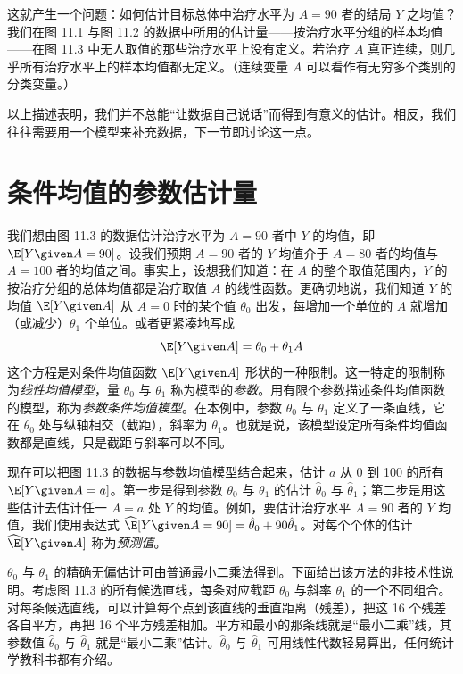 这就产生一个问题：如何估计目标总体中治疗水平为 $A=90$ 者的结局 $Y$ 之均值？我们在图 11.1 与图 11.2 的数据中所用的估计量——按治疗水平分组的样本均值——在图 11.3 中无人取值的那些治疗水平上没有定义。若治疗 $A$ 真正连续，则几乎所有治疗水平上的样本均值都无定义。（连续变量 $A$ 可以看作有无穷多个类别的分类变量。）

以上描述表明，我们并不总能“让数据自己说话”而得到有意义的估计。相反，我们往往需要用一个模型来补充数据，下一节即讨论这一点。

\section{条件均值的参数估计量}

我们想由图 11.3 的数据估计治疗水平为 $A=90$ 者中 $Y$ 的均值，即 $\E[Y\given A=90]$。设我们预期 $A=90$ 者的 $Y$ 均值介于 $A=80$ 者的均值与 $A=100$ 者的均值之间。事实上，设想我们知道：在 $A$ 的整个取值范围内，$Y$ 的按治疗分组的总体均值都是治疗取值 $A$ 的线性函数。更确切地说，我们知道 $Y$ 的均值 $\E[Y\given A]$ 从 $A=0$ 时的某个值 $\theta_0$ 出发，每增加一个单位的 $A$ 就增加（或减少）$\theta_1$ 个单位。或者更紧凑地写成
\[
\E[Y\given A]=\theta_0+\theta_1 A
\]
这个方程是对条件均值函数 $\E[Y\given A]$ 形状的一种限制。这一特定的限制称为\emph{线性均值模型}，量 $\theta_0$ 与 $\theta_1$ 称为模型的\emph{参数}。用有限个参数描述条件均值函数的模型，称为\emph{参数条件均值模型}。在本例中，参数 $\theta_0$ 与 $\theta_1$ 定义了一条直线，它在 $\theta_0$ 处与纵轴相交（截距），斜率为 $\theta_1$。也就是说，该模型设定所有条件均值函数都是直线，只是截距与斜率可以不同。

现在可以把图 11.3 的数据与参数均值模型结合起来，估计 $a$ 从 0 到 100 的所有 $\E[Y\given A=a]$。第一步是得到参数 $\theta_0$ 与 $\theta_1$ 的估计 $\hat\theta_0$ 与 $\hat\theta_1$；第二步是用这些估计去估计任一 $A=a$ 处 $Y$ 的均值。例如，要估计治疗水平 $A=90$ 者的 $Y$ 均值，我们使用表达式 $\widehat{\E}[Y\given A=90]=\hat\theta_0+90\hat\theta_1$。对每个个体的估计 $\widehat{\E}[Y\given A]$ 称为\emph{预测值}。

$\theta_0$ 与 $\theta_1$ 的精确无偏估计可由普通最小二乘法得到。下面给出该方法的非技术性说明。考虑图 11.3 的所有候选直线，每条对应截距 $\theta_0$ 与斜率 $\theta_1$ 的一个不同组合。对每条候选直线，可以计算每个点到该直线的垂直距离（残差），把这 16 个残差各自平方，再把 16 个平方残差相加。平方和最小的那条线就是“最小二乘”线，其参数值 $\hat\theta_0$ 与 $\hat\theta_1$ 就是“最小二乘”估计。$\hat\theta_0$ 与 $\hat\theta_1$ 可用线性代数轻易算出，任何统计学教科书都有介绍。

